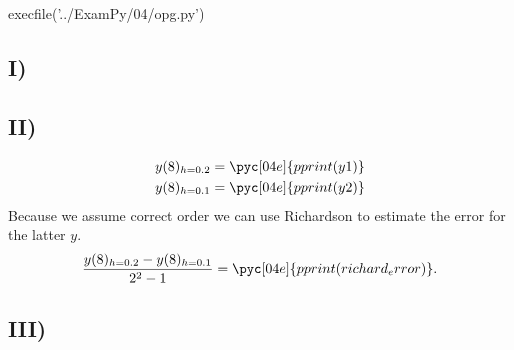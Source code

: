 \documentclass[../main.tex]{subfiles}
\begin{document}
\begin{pycode}[04e]
execfile('../ExamPy/04/opg.py')
\end{pycode}

\subsection*{I)}%
\label{sub:i_}


\subsection*{II)}%
\label{sub:ii_}


\begin{gather*}
	y(8)_{h=0.2} = \pyc[04e]{pprint(y1)}\\
	y(8)_{h=0.1} = \pyc[04e]{pprint(y2)}
\end{gather*}
Because we assume correct order we can use Richardson to estimate the error for the
latter $y$. \\
\[
	\frac{y(8)_{h=0.2}-y(8)_{h=0.1}}{2^{2}-1} = \pyc[04e]{pprint(richard_error)}
.\] 
\subsection*{III)}%
\label{sub:iii_}


\begin{figure}[ht]
\end{figure}
	

\inputminted{python}{../ExamPy/04/opg.py}
\end{document}
